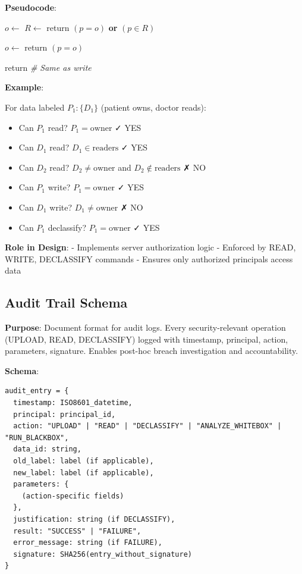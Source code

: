 \textbf{Pseudocode}:

\begin{algorithmic}
  \State $o \gets$ 
  \State $R \gets$ 
  \State return $(p = o)$ \textbf{or} $(p \in R)$
\EndFunction

  \State $o \gets$ 
  \State return $(p = o)$
\EndFunction

  \State return  \textit{\# Same as write}
\EndFunction
\end{algorithmic}

\textbf{Example}:

For data labeled $P_1: \{D_1\}$ (patient owns, doctor reads):
\begin{itemize}
\item Can $P_1$ read? $P_1 = \text{owner}$ ✓ YES
\item Can $D_1$ read? $D_1 \in \text{readers}$ ✓ YES
\item Can $D_2$ read? $D_2 \neq \text{owner}$ and $D_2 \notin \text{readers}$ ✗ NO
\item Can $P_1$ write? $P_1 = \text{owner}$ ✓ YES
\item Can $D_1$ write? $D_1 \neq \text{owner}$ ✗ NO
\item Can $P_1$ declassify? $P_1 = \text{owner}$ ✓ YES
\end{itemize}

\textbf{Role in Design}:
- Implements server authorization logic
- Enforced by READ, WRITE, DECLASSIFY commands
- Ensures only authorized principals access data

\subsection{Audit Trail Schema}

\textbf{Purpose}: Document format for audit logs. Every security-relevant operation (UPLOAD, READ, DECLASSIFY) logged with timestamp, principal, action, parameters, signature. Enables post-hoc breach investigation and accountability.

\textbf{Schema}:

\begin{verbatim}
audit_entry = {
  timestamp: ISO8601_datetime,
  principal: principal_id,
  action: "UPLOAD" | "READ" | "DECLASSIFY" | "ANALYZE_WHITEBOX" | "RUN_BLACKBOX",
  data_id: string,
  old_label: label (if applicable),
  new_label: label (if applicable),
  parameters: {
    (action-specific fields)
  },
  justification: string (if DECLASSIFY),
  result: "SUCCESS" | "FAILURE",
  error_message: string (if FAILURE),
  signature: SHA256(entry_without_signature)
}
\end{verbatim}

